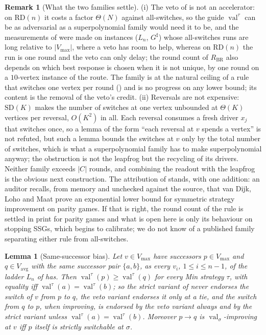 \documentclass[11pt]{article}
\theoremstyle{plain}
\newtheorem{lemma}[theorem]{Lemma}
\theoremstyle{definition}
\newtheorem{remark}[theorem]{Remark}
\DeclareMathOperator{\val}{val}
\newcommand{\Vmax}{V_{\max}}
\newcommand{\Vavg}{V_{\mathrm{avg}}}
\begin{document}
\begin{remark}[What the two families settle]\label{rem:readout}
(i) The veto of  is not an accelerator: on $\mathrm{RD}(n)$
it costs a factor $\Theta(N)$ against all-switches, so the guide
$\val^{\tau}$ can be as adversarial as a superpolynomial family would need
it to be, and the measurements of  were made on
instances ($L_n$, $G^{\sharp}$) whose all-switches runs are long relative
to $|\Vmax|$, where a veto has room to help, whereas on $\mathrm{RD}(n)$
the run is one round and the veto can only delay; the
round count of $R_{\mathrm{BR}}$ also depends on which best response is
chosen when it is not unique, by one round on a $10$-vertex instance of
the route. The family is at the natural ceiling of a rule that switches
one vertex per round () and is no progress on any
lower bound; its content is the removal of the veto's credit.
(ii) Reversals are not expensive: $\mathrm{SD}(K)$ makes the number of
switches at one vertex unbounded at $\Theta(K)$ vertices per reversal,
$O(K^{2})$ in all. Each reversal
consumes a fresh driver $x_j$ that switches once, so a lemma of the form
``each reversal at $v$ spends a vertex'' is not refuted, but such a lemma
bounds the switches at $v$ only by the total number of switches, which is
what a superpolynomial family has to make superpolynomial anyway; the
obstruction is not the leapfrog but the recycling of its drivers.
Neither family exceeds $|C|$ rounds, and combining the readout with the
leapfrog is the obvious next construction. The attribution of
 stands, with one addition: an auditor recalls, from
memory and unchecked against the source, that van Dijk, Loho and Maat
prove an exponential lower bound for symmetric strategy improvement on
parity games. If that is right, the round count of the rule is settled in
print for parity games and what is open here is only its behaviour on
stopping SSGs, which  begins to calibrate; we do not
know of a published family separating either rule from all-switches.
\end{remark}
\begin{lemma}[Same-successor bias]\label{lem:same-successor}
Let $v\in\Vmax$ have successors $p\in\Vmax$ and $q\in\Vavg$ with the same
successor pair $\{a,b\}$, as every $v_i$, $1\le i\le n-1$, of the ladder
$L_n$ of  has. Then $\val^{\tau}(p)\ge\val^{\tau}(q)$ for every
Min strategy $\tau$, with equality iff $\val^{\tau}(a)=\val^{\tau}(b)$; so
the strict variant of  never endorses the switch of $v$ from
$p$ to $q$, the veto variant endorses it only at a tie, and the switch from
$q$ to $p$, when improving, is endorsed by the veto variant always and by
the strict variant unless $\val^{\tau}(a)=\val^{\tau}(b)$. Moreover $p\to q$ is
$\val_\sigma$-improving at $v$ iff $p$ itself is strictly switchable at
$\sigma$.
\end{lemma}
\end{document}
